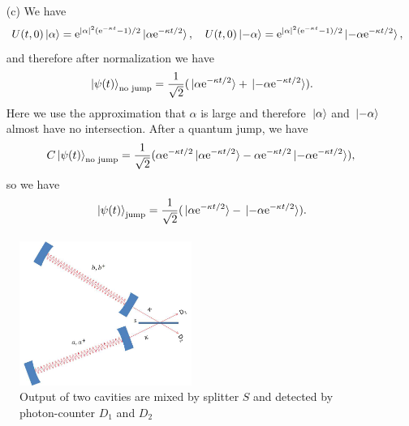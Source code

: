 \documentclass[hyperref, a4paper]{article}
\newcommand*{\ee}{\mathrm{e}}
\begin{document}
\begin{itemize}
\item[(c)] We have 
\[
    U(t, 0) \ket*{\alpha} = \ee^{\abs*{\alpha}^2 (\ee^{-\kappa t} - 1) / 2} \ket*{\alpha \ee^{- \kappa t / 2}}, \quad 
    U(t, 0) \ket*{-\alpha} = \ee^{\abs*{\alpha}^2 (\ee^{-\kappa t} - 1) / 2} \ket*{-\alpha \ee^{- \kappa t / 2}},
\] 
and therefore after normalization we have 
\begin{equation}
    \ket*{\psi(t)}_\text{no jump} = \frac{1}{\sqrt{2}} (\ket*{\alpha \ee^{- \kappa t / 2}} + \ket*{- \alpha \ee^{- \kappa t / 2}}).
\end{equation}
Here we use the approximation that $\alpha$ is large and therefore $\ket*{\alpha}$ and $\ket*{-\alpha}$ almost have 
no intersection. After a quantum jump, we have 
\[
    C \ket*{\psi(t)}_\text{no jump} = \frac{1}{\sqrt{2}} (\alpha \ee^{- \kappa t / 2} \ket*{\alpha \ee^{- \kappa t / 2}} - \alpha \ee^{- \kappa t / 2} \ket*{- \alpha \ee^{- \kappa t / 2}}),
\]
so we have 
\begin{equation}
    \ket*{\psi(t)}_\text{jump} = \frac{1}{\sqrt{2}} (\ket*{\alpha \ee^{- \kappa t / 2}} - \ket*{ - \alpha \ee^{- \kappa t / 2}}).
\end{equation}
\end{itemize}

\paragraph{} 

\begin{figure}
    \centering
    \includegraphics[width=0.5\textwidth]{fig2.png}
    \caption{Output of two cavities are mixed by splitter $S$ and detected by photon-counter $D_1$ and $D_2$}
    \label{fig:prob-2}
\end{figure}
\end{document}
